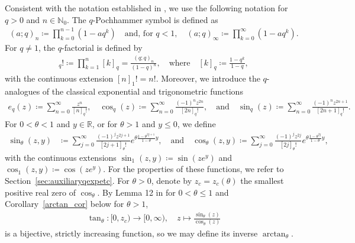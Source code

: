 \documentclass[10pt,a4paper]{amsart}
\newcommand{\N}{\mathbb{N}} %
\newcommand{\R}{\mathbb{R}} %
\newcommand{\1}{\mathds{1}}
\begin{document}
Consistent with the notation established in \cite{AR}, we use the following notation for $q>0$ and $n\in\N_0$. The $q$-Pochhammer symbol is defined as
\begin{align*}
    (a;q)_n\coloneqq\prod_{k=0}^{n-1} (1-a q^k)\quad\text{and, for }q<1, \quad(a;q)_\infty\coloneqq\prod_{k=0}^{\infty} (1-a q^k).
\end{align*}
For $q\neq 1$, the $q$-factorial is defined by
\begin{align*}
    [n]_q! \coloneqq \prod_{k=1}^{n}[k]_q   = \frac{(q;q)_n}{(1-q)^n},\quad\text{where}\quad [k]_q\coloneqq\frac{1-q^k}{1-q},
\end{align*}
with the continuous extension $[n]_1!=n!$. Moreover, we introduce the $q$-analogues of the classical exponential and trigonometric functions 
\begin{align*}
e_q(z)\coloneqq \sum_{n=0}^\infty \frac{z^{n}}{[n]_q!},\quad
    \cos_q(z) \coloneqq \sum_{n=0}^\infty \frac{(-1)^nz^{2n}}{[2n]_q!},
    \quad\text{and}\quad
    \sin_q(z) \coloneqq \sum_{n=0}^\infty \frac{(-1)^nz^{2n+1}}{[2n+1]_q!}.
\end{align*}
For $0<\theta<1$ and $y\in\R$, or for $\theta>1$ and $y\le 0$, we define
\begin{align*}
    \sin_\theta(z,y)&\coloneqq \sum_{j=0}^\infty\frac{(-1)^{j}z^{2j+1}}{[2j+1]_{\theta}!}e^{\theta\frac{1-\theta^{2j+1}}{1-\theta} y}, \quad\text{and}\quad\cos_\theta(z,y)\coloneqq\sum_{j=0}^\infty\frac{(-1)^{j}z^{2j}}{[2j]_{\theta}!}e^{\theta\frac{1-\theta^{2j}}{1-\theta} y},
\end{align*}
with the continuous extensions
$\sin_1(z,y)\coloneqq \sin(ze^y)$ and $\cos_1(z,y)\coloneqq\cos(ze^y)$. For the properties of these functions, we refer to Section~\ref{sec:auxiliaryqexpetc}.
 For $\theta>0$, denote by $z_c=z_c(\theta)$ the smallest positive real zero of $\cos_{\theta}$.  By Lemma 12 in \cite{AR} for $0<\theta\le 1$ and Corollary~\ref{arctan_cor} below for $\theta>1$, 
\begin{align*}
    \tan_{\theta}:[0,z_c)\to[0,\infty),\quad z\mapsto\frac{\sin_\theta(z)}{\cos_\theta(z)}
\end{align*}
is a bijective, strictly increasing function, so we may define its inverse $\arctan_{\theta}$. 
\end{document}

